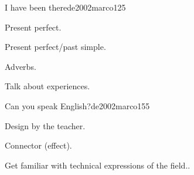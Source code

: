 \begin{syllabus}
\begin{unit}{I have been there}{}{de2002marco}{12}{5}
   \begin{topics}
      \item Present perfect.
      \item Present perfect/past simple.
      \item Adverbs.
   \end{topics}

   \begin{learningoutcomes}
      \item Talk about experiences.
   \end{learningoutcomes}

\end{unit}

\begin{unit}{Can you speak English?}{}{de2002marco}{15}{5}
   \begin{topics}
      \item Design by the teacher.
      \item Connector (effect).
   \end{topics}

   \begin{learningoutcomes}
      \item Get familiar with technical expressions of the field..
   \end{learningoutcomes}
\end{unit}

\begin{coursebibliography}
\end{coursebibliography}

\end{syllabus}
